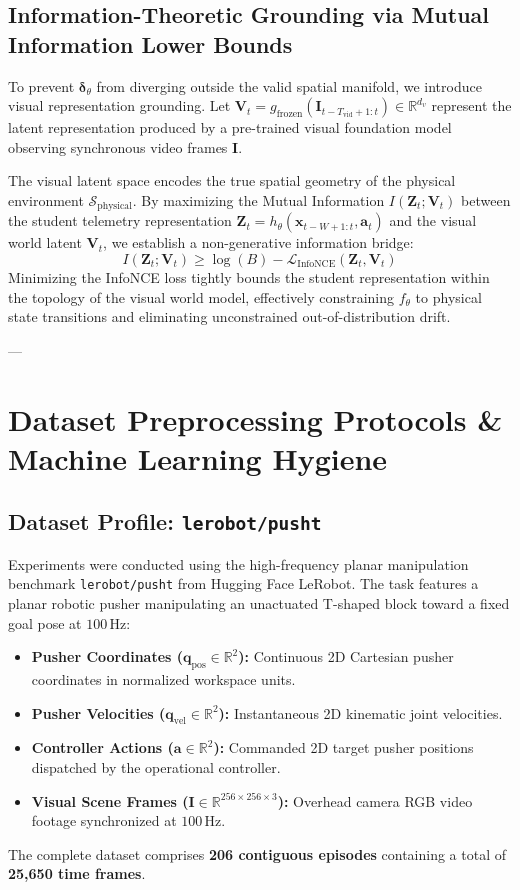 \documentclass[11pt,a4paper]{article}
\begin{document}
\subsection{Information-Theoretic Grounding via Mutual Information Lower Bounds}
To prevent $\boldsymbol{\delta}_\theta$ from diverging outside the valid spatial manifold, we introduce visual representation grounding. Let $\mathbf{V}_t = g_{\text{frozen}}(\mathbf{I}_{t-T_{\text{vid}}+1:t}) \in \mathbb{R}^{d_v}$ represent the latent representation produced by a pre-trained visual foundation model observing synchronous video frames $\mathbf{I}$.

The visual latent space encodes the true spatial geometry of the physical environment $\mathcal{S}_{\text{physical}}$. By maximizing the Mutual Information $I(\mathbf{Z}_t; \mathbf{V}_t)$ between the student telemetry representation $\mathbf{Z}_t = h_\theta(\mathbf{x}_{t-W+1:t}, \mathbf{a}_t)$ and the visual world latent $\mathbf{V}_t$, we establish a non-generative information bridge:
\begin{equation}
    I(\mathbf{Z}_t; \mathbf{V}_t) \ge \log(B) - \mathcal{L}_{\text{InfoNCE}}(\mathbf{Z}_t, \mathbf{V}_t)
\end{equation}
Minimizing the InfoNCE loss tightly bounds the student representation within the topology of the visual world model, effectively constraining $f_\theta$ to physical state transitions and eliminating unconstrained out-of-distribution drift.

---

\section{Dataset Preprocessing Protocols \& Machine Learning Hygiene}
\label{sec:dataset}

\subsection{Dataset Profile: \texttt{lerobot/pusht}}
Experiments were conducted using the high-frequency planar manipulation benchmark \texttt{lerobot/pusht} from Hugging Face LeRobot. The task features a planar robotic pusher manipulating an unactuated T-shaped block toward a fixed goal pose at $100\,\text{Hz}$:
\begin{itemize}
    \item \textbf{Pusher Coordinates ($\mathbf{q}_{\text{pos}} \in \mathbb{R}^2$):} Continuous 2D Cartesian pusher coordinates in normalized workspace units.
    \item \textbf{Pusher Velocities ($\mathbf{q}_{\text{vel}} \in \mathbb{R}^2$):} Instantaneous 2D kinematic joint velocities.
    \item \textbf{Controller Actions ($\mathbf{a} \in \mathbb{R}^2$):} Commanded 2D target pusher positions dispatched by the operational controller.
    \item \textbf{Visual Scene Frames ($\mathbf{I} \in \mathbb{R}^{256 \times 256 \times 3}$):} Overhead camera RGB video footage synchronized at $100\,\text{Hz}$.
\end{itemize}
The complete dataset comprises \textbf{206 contiguous episodes} containing a total of \textbf{25,650 time frames}.
\end{document}
